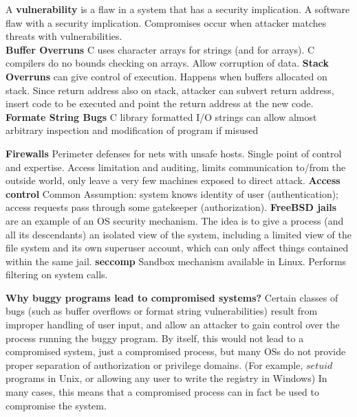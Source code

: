 \documentclass[9pt,landscape]{article}
\begin{document}
\begin{multicols}{3}
A {\bf vulnerability} is a flaw in a system that has a security implication. A software flaw with a security implication. Compromises occur when attacker matches threats with vulnerabilities.\\

{\bf Buffer Overruns} C uses character arrays for strings (and for arrays). C compilers do no bounds checking on arrays. Allow corruption of data.
{\bf Stack Overruns} can give control of execution. Happens when buffers allocated on stack. Since return address also on stack, attacker can subvert return address, insert code to be executed and point the return address at the new code.
{\bf Formate String Bugs} C library formatted I/O strings can allow almost arbitrary inspection and modification of program if misused

{\bf Firewalls} Perimeter defenses for nets with unsafe hosts. Single point of control and expertise. Access limitation and auditing, limits communication to/from the outside world, only leave a very few machines exposed to direct attack.
{\bf Access control}  Common Assumption: system knows identity of user (authentication); access requests pass through some gatekeeper (authorization).
{\bf FreeBSD jails} are an example of an OS security mechanism. The idea is to give a process (and all its descendants) an isolated view of the system, including a limited view of the file system and its own superuser account, which can only affect things contained within the same jail.
{\bf seccomp} Sandbox mechanism available in Linux. Performs filtering on system calls.

{\bf Why buggy programs lead to compromised systems?} 
Certain classes of bugs (such as buffer overflows or format string vulnerabilities) result from improper handling of user input, and allow an attacker to gain control over the process running the buggy program. By itself, this would not lead to a compromised system, just a compromised process, but many OSs do not provide proper separation of authorization or privilege domains. (For example, $setuid$ programs in Unix, or allowing any user to write the registry in Windows) In many cases, this means that a compromised process can in fact be used to compromise the system.\\

\scriptsize


\end{multicols}
\end{document}
